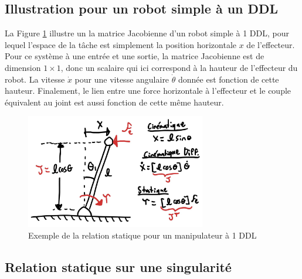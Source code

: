 \subsection{Illustration pour un robot simple à un DDL}

La Figure \ref{fig:static1dofexemple} illustre un la matrice Jacobienne d'un robot simple à 1 DDL, pour lequel l'espace de la tâche est simplement la position horizontale $x$ de l'effecteur. Pour ce système à une entrée et une sortie, la matrice Jacobienne est de dimension $1\times1$, donc un scalaire qui ici correspond à la hauteur de l'effecteur du robot. La vitesse $\dot{x}$ pour une vitesse angulaire $\dot{\theta}$ donnée est fonction de cette hauteur. Finalement, le lien entre une force horizontale à l'effecteur et le couple équivalent au joint est aussi fonction de cette même hauteur.

\begin{figure}[H]
	\centering
	\includegraphics[width=0.70\textwidth]{fig/static1dofexemple.jpg}
	\caption{Exemple de la relation statique pour un manipulateur à 1 DDL}
	\label{fig:static1dofexemple}
\end{figure}

\subsection{Relation statique sur une singularité}

